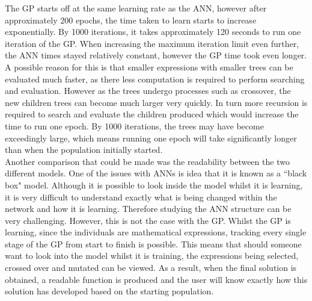 \documentclass[11pt]{article}
\begin{document}
The GP starts off at the same learning rate as the ANN, however after approximately 200 epochs, the time taken to learn starts to increase exponentially. By 1000 iterations, it takes approximately 120 seconds to run one iteration of the GP. When increasing the maximum iteration limit even further, the ANN times stayed relatively constant, however the GP time took even longer.  A possible reason for this is that smaller expressions with smaller trees can be evaluated much faster, as there less computation is required to perform searching and evaluation. However as the trees undergo processes such as crossover, the new children trees can become much larger very quickly. In turn more recursion is required to search and evaluate the children produced which would increase the time to run one epoch. By 1000 iterations, the trees may have become exceedingly large, which means running one epoch will take significantly longer than when the population initially started. \\
Another comparison that could be made was the readability between the two different models. One of the issues with ANNs is idea that it is known as a ``black box" model. Although it is possible to look inside the model whilst it is learning, it is very difficult to understand exactly what is being changed within the network and how it is learning. Therefore studying the ANN structure can be very challenging. However, this is not the case with the GP. Whilst the GP is learning, since the individuals are mathematical expressions, tracking every single stage of the GP from start to finish is possible. This means that should someone want to look into the model whilst it is training, the expressions being selected, crossed over and mutated can be viewed. As a result, when the final solution is obtained, a readable function is produced and the user will know exactly how this solution has developed based on the starting population. \\
\end{document}
